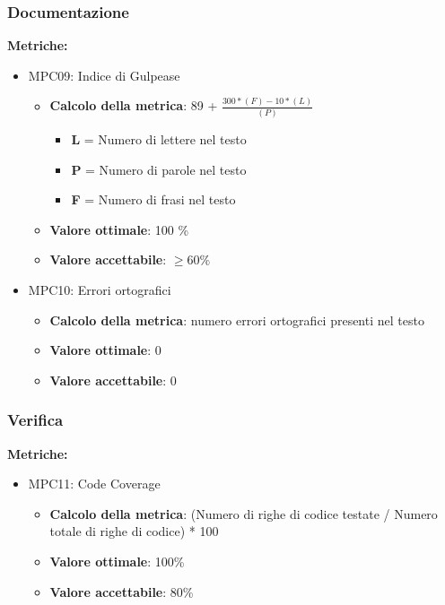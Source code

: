 \documentclass[12pt]{article}
\begin{document}
\subsubsection{Documentazione}
\textbf{Metriche:}
\begin{itemize}
	\item MPC09: Indice di Gulpease
	      \begin{itemize}
		      \item \textbf{Calcolo della metrica}:  89 + $\frac{300*(F) - 10 * (L)}{(P)}$
		            \begin{itemize}
			            \item \textbf{L} = Numero di lettere nel testo
			            \item \textbf{P} = Numero di parole nel testo
			            \item \textbf{F} = Numero di frasi nel testo
		            \end{itemize}
		      \item \textbf{Valore ottimale}: 100 \%
		      \item \textbf{Valore accettabile}: $\ge 60\%$
	      \end{itemize}
\end{itemize}
\begin{itemize}
	\item MPC10: Errori ortografici
	      \begin{itemize}
		      \item \textbf{Calcolo della metrica}: numero errori ortografici presenti nel testo
		      \item \textbf{Valore ottimale}: 0
		      \item \textbf{Valore accettabile}: 0
	      \end{itemize}
\end{itemize}

\subsubsection{Verifica}

\textbf{Metriche:}
\begin{itemize}
	\item MPC11: Code Coverage
	      \begin{itemize}
		      \item \textbf{Calcolo della metrica}:  (Numero di righe di codice testate / Numero totale di righe di codice) * 100
		      \item \textbf{Valore ottimale}: 100\%
		      \item \textbf{Valore accettabile}: 80\%
	      \end{itemize}
\end{itemize}
\end{document}
